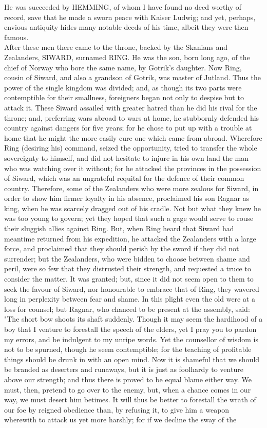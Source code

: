 \documentclass[10pt,a4paper]{report}
\begin{document}
He was succeeded by HEMMING, of whom I have found no deed worthy of record, save that he made a sworn peace with Kaiser Ludwig; and yet, perhaps, envious antiquity hides many notable deeds of his time, albeit they were then famous.\\

After these men there came to the throne, backed by the Skanians and Zealanders, SIWARD, surnamed RING. He was the son, born long ago, of the chief of Norway who bore the same name, by Gotrik's daughter. Now Ring, cousin of Siward, and also a grandson of Gotrik, was master of Jutland. Thus the power of the single kingdom was divided; and, as though its two parts were contemptible for their smallness, foreigners began not only to despise but to attack it. These Siward assailed with greater hatred than he did his rival for the throne; and, preferring wars abroad to wars at home, he stubbornly defended his country against dangers for five years; for he chose to put up with a trouble at home that he might the more easily cure one which came from abroad. Wherefore Ring (desiring his) command, seized the opportunity, tried to transfer the whole sovereignty to himself, and did not hesitate to injure in his own land the man who was watching over it without; for he attacked the provinces in the possession of Siward, which was an ungrateful requital for the defence of their common country. Therefore, some of the Zealanders who were more zealous for Siward, in order to show him firmer loyalty in his absence, proclaimed his son Ragnar as king, when he was scarcely dragged out of his cradle. Not but what they knew he was too young to govern; yet they hoped that such a gage would serve to rouse their sluggish allies against Ring. But, when Ring heard that Siward had meantime returned from his expedition, he attacked the Zealanders with a large force, and proclaimed that they should perish by the sword if they did not surrender; but the Zealanders, who were bidden to choose between shame and peril, were so few that they distrusted their strength, and requested a truce to consider the matter. It was granted; but, since it did not seem open to them to seek the favour of Siward, nor honourable to embrace that of Ring, they wavered long in perplexity between fear and shame. In this plight even the old were at a loss for counsel; but Ragnar, who chanced to be present at the assembly, said: "The short bow shoots its shaft suddenly. Though it may seem the hardihood of a boy that I venture to forestall the speech of the elders, yet I pray you to pardon my errors, and be indulgent to my unripe words. Yet the counsellor of wisdom is not to be spurned, though he seem contemptible; for the teaching of profitable things should be drunk in with an open mind. Now it is shameful that we should be branded as deserters and runaways, but it is just as foolhardy to venture above our strength; and thus there is proved to be equal blame either way. We must, then, pretend to go over to the enemy, but, when a chance comes in our way, we must desert him betimes. It will thus be better to forestall the wrath of our foe by reigned obedience than, by refusing it, to give him a weapon wherewith to attack us yet more harshly; for if we decline the sway of the 
\end{document}
